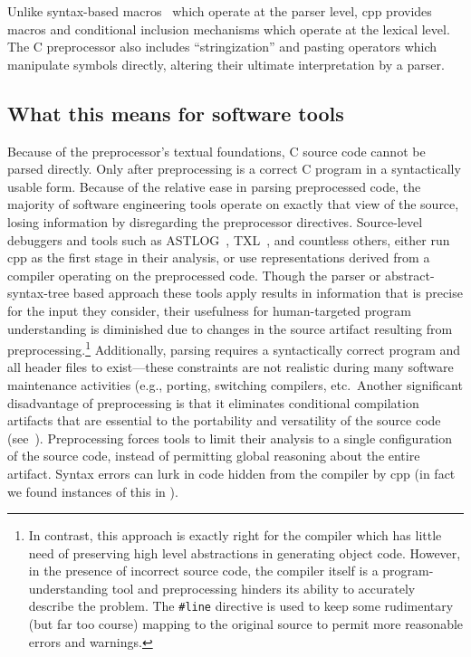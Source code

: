 \documentclass{article}
\newcommand{\Cpp}{\mbox{\textsf{cpp}}}
\newcommand{\C}{\mbox{\textsf{C}}}
\newcommand{\ppd}[1]{\texttt{\##1}}
\newcommand{\eg}{e.g.,}
\newcommand{\etc}{etc}  %
\begin{document}
Unlike syntax-based macros~\cite{Weise93} which operate at the parser
level, \Cpp{} provides macros and conditional inclusion mechanisms which
operate at the lexical level.  The \C{} preprocessor also includes
``stringization'' and pasting operators which manipulate symbols
directly, altering their ultimate interpretation by a parser.  

\subsection{What this means for software tools}

Because of the preprocessor's textual foundations, \C{} source code
cannot be parsed directly.  Only after preprocessing is a correct \C{}
program in a syntactically usable form. Because of the relative ease in
parsing preprocessed code, the majority of software engineering tools
operate on exactly that view of the source, losing information by
disregarding the preprocessor directives.  Source-level debuggers and
tools such as ASTLOG~\cite{Crew97}, TXL~\cite{TXL}, and countless
others, either run \Cpp{} as the first stage in their analysis, or use
representations derived from a compiler operating on the preprocessed
code.  Though the parser or abstract-syntax-tree based approach these
tools apply results in information that is precise for the input they
consider, their usefulness for human-targeted program understanding is
diminished due to changes in the source artifact resulting from
preprocessing.\footnote{In contrast, this approach is exactly right for
  the compiler which has little need of preserving high level
  abstractions in generating object code.  However, in the presence of
  incorrect source code, the compiler itself is a program-understanding
  tool and preprocessing hinders its ability to accurately describe the
  problem.  The \ppd{line} directive is used to keep some rudimentary
  (but far too course) mapping to the original source to permit more
  reasonable errors and warnings.}  Additionally, parsing requires a
syntactically correct program and all header files to exist---these
constraints are not realistic during many software maintenance
activities (\eg{} porting, switching compilers, \etc.\ Another
significant disadvantage of preprocessing is that it eliminates
conditional compilation artifacts that are essential to the portability
and versatility of the source code (see~\cite{Krone94}).  Preprocessing
forces tools to limit their analysis to a single configuration of the
source code, instead of permitting global reasoning about the entire
artifact.  Syntax errors can lurk in code hidden from the compiler by
\Cpp{} (in fact we found instances of this in \cite{EmpCpp}).
\end{document}
